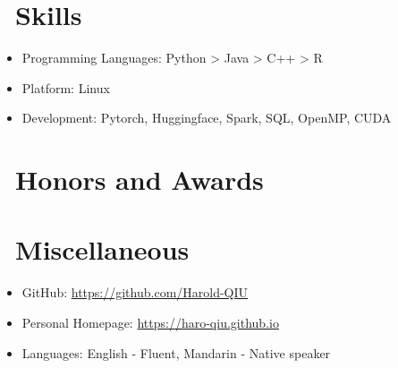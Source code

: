 \documentclass{resume}
\begin{document}


\section{\faCogs\ Skills}
\begin{itemize}[parsep=0.5ex]
  \item Programming Languages: Python > Java > C++ > R
  \item Platform: Linux
  \item Development: Pytorch, Huggingface, Spark, SQL, OpenMP, CUDA
\end{itemize}

\section{\faHeartO\ Honors and Awards}

\section{\faInfo\ Miscellaneous}
\begin{itemize}[parsep=0.5ex]
  \item GitHub: \href{https://github.com/Harold-QIU}{https://github.com/Harold-QIU}
  \item Personal Homepage: \href{https://haro-qiu.github.io}{https://haro-qiu.github.io}
  \item Languages: English - Fluent, Mandarin - Native speaker
\end{itemize}

%
%
\end{document}
